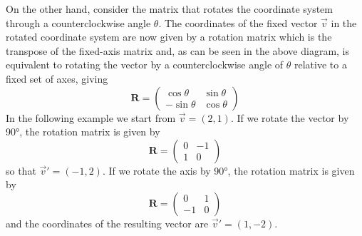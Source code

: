 On the other hand, consider the matrix that rotates the coordinate system through 
a counterclockwise angle $\theta$. The coordinates of the fixed vector $\vec{v}$ in the rotated 
coordinate system are now given by a rotation matrix which is the transpose of 
the fixed-axis matrix and, as can be seen in the above diagram, is equivalent to rotating 
the vector by a counterclockwise angle of $\theta$ relative to a fixed set of axes, giving 
\[
{\bm R}=
\left(
\begin{array}{cc}
\cos\theta & \sin \theta \\
-\sin\theta & \cos\theta
\end{array}
\right)
\]
In the following example we start from $\vec{v}=(2,1)$. If we rotate the vector by 90\si{\degree}, 
the rotation matrix is given by 
\[
{\bm R}=
\left(
\begin{array}{cc}
0 & -1 \\ 1 & 0 
\end{array}
\right)
\]
so that $\vec{v}'=(-1,2)$. 
If we rotate the axis by 90\si{\degree}, the 
rotation matrix is given by 
\[
{\bm R}=
\left(
\begin{array}{cc}
0 & 1 \\ -1 & 0 
\end{array}
\right)
\]
and the coordinates of the resulting vector are $\vec{v}'=(1,-2)$.


